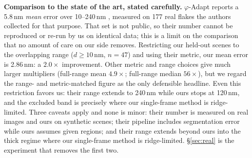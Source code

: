 \documentclass[10pt]{article}
\begin{document}
\textbf{Comparison to the state of the art, stated carefully.} $\varphi$-Adapt reports a 5.8\,nm \emph{mean} error over 10--240\,nm \cite{phiadapt2025}, measured on 177 real flakes the authors collected for that purpose. That set is not public, so their number cannot be reproduced or re-run by us on identical data; this is a limit on the comparison that no amount of care on our side removes. Restricting our held-out scenes to the overlapping range ($d\ge10$\,nm, $n{=}47$) and using their metric, our mean error is 2.86\,nm: a $\mathbf{2.0\times}$ improvement. Other metric and range choices give much larger multipliers (full-range mean $4.9\times$; full-range median $56\times$), but we regard the range- and metric-matched figure as the only defensible headline. Even this restriction favors us: their range extends to 240\,nm while ours stops at 120\,nm, and the excluded band is precisely where our single-frame method is ridge-limited. Three caveats apply and none is minor: their number is measured on real images and ours on synthetic scenes; their pipeline includes segmentation error while ours assumes given regions; and their range extends beyond ours into the thick regime where our single-frame method is ridge-limited. \S\ref{sec:real} is the experiment that removes the first two.
\end{document}
